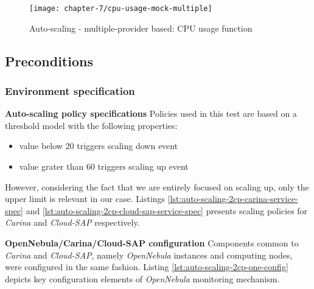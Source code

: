 \begin{figure}[!ht]
  \begin{center}
    \texttt{[image: chapter-7/cpu-usage-mock-multiple]}
  \end{center}
  \caption{Auto-scaling - multiple-provider based: CPU usage function}
  \label{eval:auto-scaling-2cp-cpu-usage-function}
\end{figure}


\subsection*{Preconditions}
\subsubsection*{Environment specification}
\begin{asparaenum}
  \item[\textbf{Auto-scaling policy specifications}] Policies used in this test are based on a threshold model with the following properties:
  \begin{itemize}
   \item value below 20 triggers scaling down event
   \item value grater than 60 triggers scaling up event
  \end{itemize}
  However, considering the fact that we are entirely focused on scaling up, only the upper limit is relevant in our case. Listings \ref{lst:auto-scaling-2cp-carina-service-spec} and \ref{lst:auto-scaling-2cp-cloud-sap-service-spec} presents scaling policies for \emph{Carina} and \emph{Cloud-SAP} respectively.
  
  
  
  
  \item[\textbf{OpenNebula/Carina/Cloud-SAP configuration}] 
  Components common to \emph{Carina} and \emph{Cloud-SAP}, namely \emph{OpenNebula} instances and computing nodes, were configured in the same fashion. Listing \ref{lst:auto-scaling-2cp-one-config} depicts key configuration elements of \emph{OpenNebula} monitoring mechanism.
  

\end{asparaenum}
